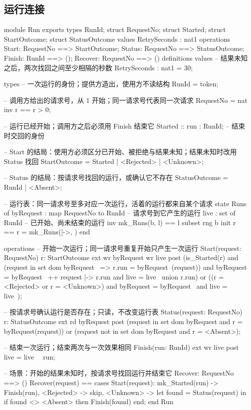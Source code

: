 \subsection{运行连接}

\begin{vdm_al}
module Run
exports
  types RunId; struct RequestNo; struct Started; struct StartOutcome; struct StatusOutcome
  values RetrySeconds : nat1
  operations
    Start: RequestNo ==> StartOutcome;
    Status: RequestNo ==> StatusOutcome;
    Finish: RunId ==> ();
    Recover: RequestNo ==> ()
definitions
values
  -- 结果未知之后，两次找回之间至少相隔的秒数
  RetrySeconds : nat1 = 30;

types
  -- 一次运行的身份；提供方造出，使用方不读结构
  RunId = token;

  -- 调用方给出的请求号，从 1 开始；同一请求号代表同一次请求
  RequestNo = nat
  inv r == r > 0;

  -- 运行已经开始；调用方之后必须用 Finish 结束它
  Started ::
    run : RunId;  -- 结束时交回的身份

  -- Start 的结局：使用方必须区分已开始、被拒绝与结果未知；结果未知时改用 Status 找回
  StartOutcome = Started | <Rejected> | <Unknown>;

  -- Status 的结局：按请求号找回的运行，或确认它不存在
  StatusOutcome = RunId | <Absent>;

  -- 运行表：同一请求号至多对应一次运行，活着的运行都来自某个请求
state Runs of
  byRequest : map RequestNo to RunId  -- 请求号到它产生的运行
  live : set of RunId  -- 已开始、尚未结束的运行
  inv mk_Runs(b, l) == l subset rng b
  init r == r = mk_Runs({|->}, {})
end

operations
  -- 开始一次运行；同一请求号重复开始只产生一次运行
  Start(request: RequestNo) r: StartOutcome
  ext wr byRequest wr live
  post (is_Started(r)
          and (request in set dom byRequest~ => r.run = byRequest~(request))
          and byRequest = byRequest~ ++ {request |-> r.run}
          and live = live~ union {r.run})
       or ((r = <Rejected> or r = <Unknown>) and byRequest = byRequest~ and live = live~);

  -- 按请求号确认运行是否存在；只读，不改变运行表
  Status(request: RequestNo) r: StatusOutcome
  ext rd byRequest
  post (request in set dom byRequest and r = byRequest(request))
       or (request not in set dom byRequest and r = <Absent>);

  -- 结束一次运行；结束两次与一次效果相同
  Finish(run: RunId)
  ext wr live
  post live = live~ \ {run};

  -- 场景：开始的结果未知时，按请求号找回运行并结束它
  Recover: RequestNo ==> ()
  Recover(request) ==
    cases Start(request):
      mk_Started(run) -> Finish(run),
      <Rejected> -> skip,
      <Unknown> ->
        let found = Status(request) in
          if found <> <Absent> then Finish(found)
    end;
end Run
\end{vdm_al}
